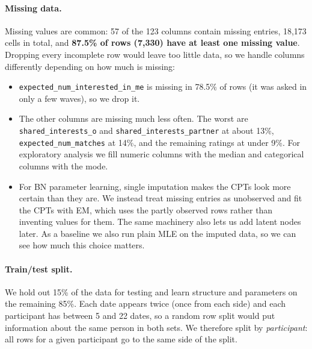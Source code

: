 \documentclass{article}
\begin{document}
\paragraph{Missing data.}
Missing values are common: 57 of the 123 columns contain missing
entries, 18,173 cells in total, and \textbf{87.5\% of rows (7,330) have at least
one missing value}. Dropping every incomplete row would leave too little data, so we
handle columns differently depending on how much is missing:
\begin{itemize}
  \item \texttt{expected\_num\_interested\_in\_me} is missing in 78.5\% of rows
        (it was asked in only a few waves), so we drop it.
  \item The other columns are missing much less often. The worst are
        \texttt{shared\_interests\_o} and \texttt{shared\_interests\_partner}
        at about 13\%, \texttt{expected\_num\_matches} at 14\%, and
        the remaining ratings at under 9\%. For exploratory analysis we fill
        numeric columns with the median and categorical columns with the mode.
  \item For BN parameter learning, single imputation makes the
        CPTs look more certain than they are. We instead treat missing entries as
        unobserved and fit the CPTs with EM, which uses the partly observed
        rows rather than inventing values for them. The same machinery
        also lets us add latent nodes later. As a baseline we also run plain MLE
        on the imputed data, so we can see how much this choice matters.
\end{itemize}

\paragraph{Train/test split.}
We hold out 15\% of the data for testing and learn structure and parameters on
the remaining 85\%. Each date appears twice (once from each side) and each
participant has between 5 and 22 dates, so a random row split would put information
about the same person in both sets. We therefore split by \emph{participant}:
all rows for a given participant go to the same side of the split.
\end{document}
